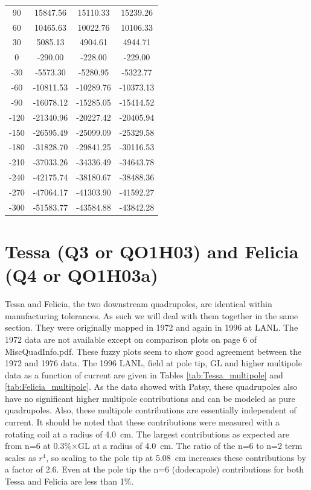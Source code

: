 \documentclass[12pt]{article}
\begin{document}
\begin{table}[!ht]
\begin{center}
\begin{tabular}{|c|c|c|c|}
90	&15847.56	&15110.33	&15239.26\\
60	&10465.63	&10022.76	&10106.33\\
30	&5085.13		&4904.61		&4944.71\\
0	&-290.00		&-228.00		&-229.00\\
-30	&-5573.30		&-5280.95		&-5322.77\\
-60	&-10811.53	&-10289.76	&-10373.13\\
-90	&-16078.12	&-15285.05	&-15414.52\\
-120	&-21340.96	&-20227.42	&-20405.94\\
-150	&-26595.49	&-25099.09	&-25329.58\\
-180	&-31828.70	&-29841.25	&-30116.53\\
-210	&-37033.26	&-34336.49	&-34643.78\\
-240	&-42175.74	&-38180.67	&-38488.36\\
-270	&-47064.17	&-41303.90	&-41592.27\\
-300	&-51583.77	&-43584.88	&-43842.28\\\hline
\end{tabular}
\end{center}
\end{table}
\FloatBarrier
\section{Tessa (Q3 or QO1H03) and Felicia (Q4 or QO1H03a)}
Tessa and Felicia, the two downstream quadrupoles, are identical within manufacturing tolerances. As such we will deal with them together in the same section. They were originally mapped in 1972 and again in 1996 at LANL. The 1972 data are not available except on comparison plots on page 6 of MiscQuadInfo.pdf. These fuzzy plots seem to show good agreement between the 1972 and 1976 data. The 1996 LANL, field at pole tip, GL and higher multipole data as a function of current are given in Tables \ref{tab:Tessa_multipole} and \ref{tab:Felicia_multipole}. As the data showed with Patsy, these quadrupoles also have no significant higher multipole contributions and can be modeled as pure quadrupoles. Also, these multipole contributions are essentially independent of current. It should be noted that these contributions were measured with a rotating coil at a radius of 4.0~cm. The largest contributions as expected are from n=6 at 0.3\%$\times$GL at a radius of 4.0~cm. The ratio of the n=6 to n=2 term scales as $r^4$, so scaling to the pole tip at 5.08~cm increases these contributions by a factor of 2.6. Even at the pole tip the n=6 (dodecapole) contributions for both Tessa and Felicia are less than 1\%.
\end{document}
